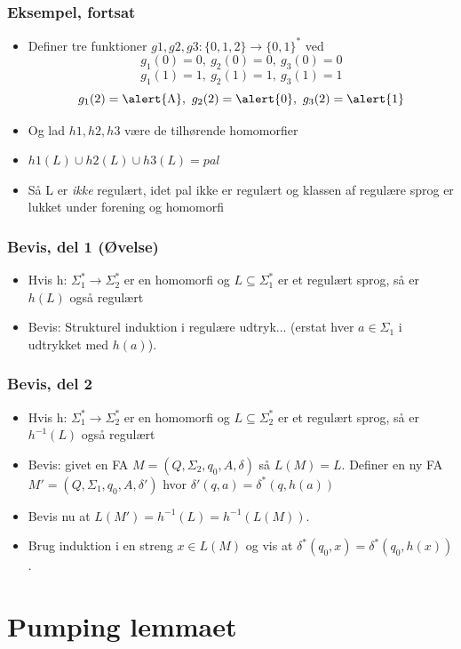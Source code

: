 \begin{frame}
\frametitle{Eksempel, fortsat}
\begin{itemize}[<+->]
\item  Definer tre funktioner  $g1,g2,g3:  \{0,1,2\}\rightarrow\{0,1\}^*$  ved 
\[g_1(0)=0,\ g_2(0)=0,\ g_3(0)=0 \]
\[g_1(1)=1,\ g_2(1)=1,\ g_3(1)=1 \]
\[g_1(2)=\alert{\Lambda},\ g_2(2)=\alert{0},\ g_3(2)=\alert{1} \]
\item  Og lad $h1,h2,h3$ være de tilhørende homomorfier 
\item  $h1(L) \cup h2(L) \cup h3(L) = pal$ 
\item  Så L er \emph{ikke} regulært, idet pal ikke er regulært og klassen  
af regulære sprog er lukket under forening og homomorfi
\end{itemize}
\end{frame}

\begin{frame}
\frametitle{Bevis, del 1 (Øvelse)}
\begin{itemize}[<+->]
\item Hvis h: $\Sigma_1^*\rightarrow\Sigma_2^*$ er en homomorfi og
  $L\subseteq\Sigma_1^*$ er et regulært sprog, så er $h(L)$ også regulært
  \item Bevis: Strukturel induktion i regulære udtryk...
    (erstat hver $a\in\Sigma_1$ i udtrykket med $h(a)$).
\end{itemize}
\end{frame}

\begin{frame}
\frametitle{Bevis, del 2}
\begin{itemize}[<+->]
\item Hvis h: $\Sigma_1^*\rightarrow\Sigma_2^*$ er en homomorfi og
  $L\subseteq\Sigma_2^*$ er et regulært sprog, så er $h^{-1}(L)$ også regulært
  \item Bevis: givet en FA $M=(Q, \Sigma_2, q_0, A, \delta)$ så $L(M)=L$.
    Definer en ny FA $M' = (Q, \Sigma_1, q_0, A, \delta ')$ hvor
    $\delta '(q,a) = \delta^*(q,h(a))$
  \item Bevis nu at $L(M')=h^{-1}(L)=h^{-1}(L(M))$.
  \item Brug induktion i en
    streng $x\in L(M)$ og vis at $\delta^*(q_0,x) =
    \delta^*(q_0,h(x))$.
\end{itemize}
\end{frame}

\section{Pumping lemmaet}

